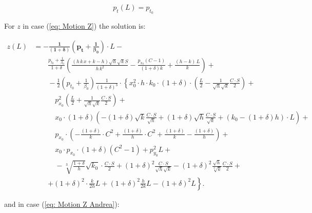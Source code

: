 \documentclass[12pt]{article}
\begin{document}
\begin{equation}
\label{eq: PT}
p_{t}(L) = p_{t_{0}}
\end{equation}

For $z$ in case (\ref{eq: Motion Z}) the solution is:

\begin{align}
z(L)& =  \pmb {-\frac{1}{(1+\delta)}\left(p_{t} +\frac{1}{\beta_{0}}  \right)}  \cdot L \nonumber  - \\
  &\qquad \frac{p_{t_{0}}+\frac{1}{\beta_{0}}}{1+\delta}\left(\frac{\left(h\, k\, x+k-h\right)\sqrt{h}\sqrt{k}S}{h\, k^{2}}-\frac{p_{x_{0}}\left(C-1\right)}{\left(1+\delta\right)k}+\frac{\left(h-k\right)\, L}{k}\right)+ \nonumber \\
 & \qquad-\frac{1}{2}\left(p_{t_{0}}+\frac{1}{\beta_{0}}\right)\frac{1}{\left(1+\delta\right)^{3}}\cdot\left\{ x_{0}^{2}\right.\cdot h\cdot k_{0}\cdot\left(1+\delta\right)\cdot\left(\frac{L}{2}-\frac{1}{\sqrt{h}\sqrt{k}}\frac{C\cdot S}{2}\right)+ \nonumber\\
 & \qquad\quad p_{x_{0}}^{2}\left(\frac{L}{2}+\frac{1}{\sqrt{h}\sqrt{k}}\frac{C\cdot S}{2}\right) + \nonumber \\
 & \qquad\quad  x_{0}\cdot\left(1+\delta\right)\left(-\left(1+\delta\right)\sqrt{k}\frac{C\cdot S}{\sqrt{h}}+\left(1+\delta\right)\sqrt{h}\frac{C\cdot S}{\sqrt{k}}+\left(k_{0}-\left(1+\delta\right)h\right)\cdot L\right) +\nonumber \\
 & \qquad\quad  p_{x_{0}}\cdot\left(-\frac{\left(1+\delta\right)}{k}\cdot C^{2}+\frac{\left(1+\delta\right)}{h}\cdot C^{2}+\frac{\left(1+\delta\right)}{k}-\frac{\left(1+\delta\right)}{h}\right)+ \nonumber\\
 & \qquad\quad x_{0}\cdot p_{x_{0}}\cdot\left(1+\delta\right)\left(C^{2}-1\right)+p_{y_{0}}^{2}L+ \nonumber \\
 & \qquad\quad-\sqrt[3]{\frac{1+\delta}{h}}\sqrt{k_{0}}\cdot\frac{C\cdot S}{2}+\left(1+\delta\right)^{2}\frac{C\cdot S}{\sqrt{h}\sqrt{k}}-\left(1+\delta\right)^{2}\frac{\sqrt{h}}{\sqrt[3]{k}}\frac{C\cdot S}{2}+ \nonumber\\
 & \qquad\left.+\left(1+\delta\right)^{2}\cdot\frac{k}{2h}L+\left(1+\delta\right)^{2}\frac{h}{2k}L-\left(1+\delta\right)^{2}L\right\} .
 \label{eq:Z}
\end{align}

and in case (\ref{eq: Motion Z Andrea}):
\end{document}
